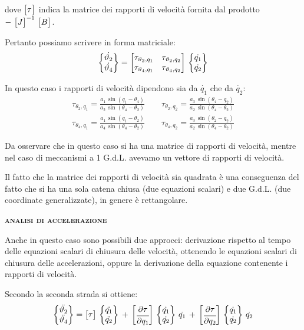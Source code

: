 		dove $\begin{bmatrix}\tau\end{bmatrix}$ indica la matrice dei rapporti di velocità fornita dal prodotto $-\,\begin{bmatrix}J\end{bmatrix}^{-1}\,\begin{bmatrix}B\end{bmatrix}$.
		
		Pertanto possiamo scrivere in forma matriciale:
		\[
		\begin{Bmatrix}\dot{\vartheta_2}\\\dot{\vartheta_4}\end{Bmatrix}=\begin{bmatrix}\tau_{\vartheta_2,q_1}&\tau_{\vartheta_2,q_2}\\\tau_{\vartheta_4,q_1}&\tau_{\vartheta_4,q_2}\end{bmatrix}\,\begin{Bmatrix}\dot{q_1}\\\dot{q_2}\end{Bmatrix}
		\]
		
		In questo caso i rapporti di velocità dipendono sia da $\dot{q_1}$ che da $\dot{q_2}$:
		\begin{gather*}
		\tau_{\theta_2,q_1} = \frac{a_1\,\sin{(q_1-\theta_4)}}{a_2\,\sin{(\theta_4 - \theta_2)}}\quad\quad \tau_{\theta_2,q_2} = \frac{a_3\,\sin{(\theta_4 - q_2)}}{a_2\,\sin{(\theta_4 - \theta_2)}}\\
		\tau_{\theta_4,q_1} = \frac{a_1\,\sin{(q_1-\theta_2)}}{a_4\,\sin{(\theta_4-\theta_2)}}\quad\quad  \tau_{\theta_4,q_2} = \frac{a_3\,\sin{(\theta_2 - q_2)}}{a_2\,\sin{(\theta_4 - \theta_2)}}
		\end{gather*}
		
		Da osservare che in questo caso si ha una matrice di rapporti di velocità, mentre nel caso di meccanismi a 1 G.d.L. avevamo un vettore di rapporti di velocità.
		
		Il fatto che la matrice dei rapporti di velocità sia quadrata è una conseguenza del fatto che si ha una sola catena chiusa (due equazioni scalari) e due G.d.L. (due coordinate generalizzate), in genere è rettangolare.
		
		
		\begin{center}
	{\scshape{\bfseries analisi di accelerazione}}
	\end{center}
		
		Anche in questo caso sono possibili due approcci: derivazione rispetto al tempo delle equazioni scalari di chiusura delle velocità, ottenendo le equazioni scalari di chiusura delle accelerazioni, oppure la derivazione della equazione contenente i rapporti di velocità.
		
		Secondo la seconda strada si ottiene:
		\[
		\begin{Bmatrix}\ddot{\vartheta_2}\\\ddot{\vartheta_4}\end{Bmatrix} = \begin{bmatrix}\tau\end{bmatrix}\,\begin{Bmatrix}\ddot{q_1}\\\ddot{q_2}\end{Bmatrix}\,+\,\begin{bmatrix}\cfrac{\partial\tau}{\partial q_1}\end{bmatrix}\,\begin{Bmatrix}\dot{q_1}\\\dot{q_2}\end{Bmatrix}\,\dot{q_1}\,+\,\begin{bmatrix}\cfrac{\partial\tau}{\partial q_2}\end{bmatrix}\,\begin{Bmatrix}\dot{q_1}\\\dot{q_2}\end{Bmatrix}\,\dot{q_2}\]
		
